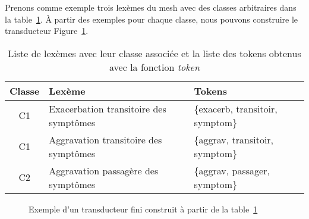 \begin{example}
    \label{ex:fst}
    Prenons comme exemple trois lexèmes du \gls{mesh} avec des classes arbitraires dans la table~\ref{tab:fst-ex}.
    À partir des exemples pour chaque classe, nous pouvons construire le transducteur Figure~\ref{fig:fst-ex}.

    \begin{table}[htb]
        \centering
        \begin{tabular}{cll}
            Classe & Lexème                                 & Tokens                           \\
            \hline
            C1     & Exacerbation transitoire des symptômes & \{exacerb, transitoir, symptom\} \\
            C1     & Aggravation transitoire des symptômes  & \{aggrav,  transitoir, symptom\} \\
            C2     & Aggravation passagère des symptômes    & \{aggrav,  passager,   symptom\} \\
        \end{tabular}
        \caption{Liste de lexèmes avec leur classe associée et la liste des tokens obtenus avec la fonction \textit{token}}
        \label{tab:fst-ex}
    \end{table}

    \begin{figure}[!htb]
        \small
        \centering
        \caption{Exemple d'un transducteur fini construit à partir de la table~\ref{tab:fst-ex}}
        \label{fig:fst-ex}
    \end{figure}
\end{example}

